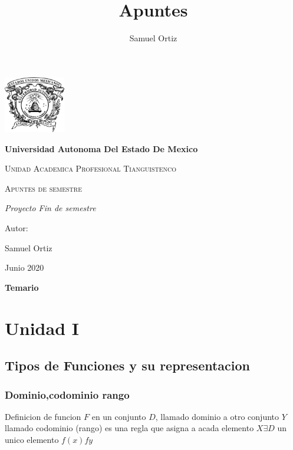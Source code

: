 \documentclass[english,10pt,a4paper]{article}
\title{Apuntes }
\author{Samuel Ortiz}
\begin{document}
	\begin{titlepage}
		\centering
		{\includegraphics[width=0.2\textwidth]{logo}\par}
		\vspace{1cm}
		{\bfseries\LARGE Universidad Autonoma Del Estado De Mexico\par}
		\vspace{1cm}
		{\scshape\Large Unidad Academica Profesional Tianguistenco \par}
		\vspace{3cm}
		{\scshape\Huge Apuntes de semestre\par}
		\vspace{3cm}
		{\itshape\Large Proyecto Fin de semestre \par}
		\vfill
		{\Large Autor: \par}
		{\Large Samuel Ortiz \par}
		\vfill
		{\Large Junio 2020 \par}
		\end{titlepage}
		\newpage
		
		
	\begin{titlepage}
		\centering 
				{\bfseries\LARGE  Temario \par}
				\tableofcontents

\end{titlepage}
\newpage
\section{Unidad I}
	\subsection{Tipos de Funciones y su representacion}
		\subsubsection{Dominio,codominio rango}
			Definicion de funcion $F$ en un conjunto $D$, llamado dominio a otro conjunto $Y$ llamado codominio (rango) es una regla que asigna a acada elemento  $X \exists D$ un unico elemento $f(x)  fy$
			 \vspace{0.3cm} \\
			 
\end{document}
